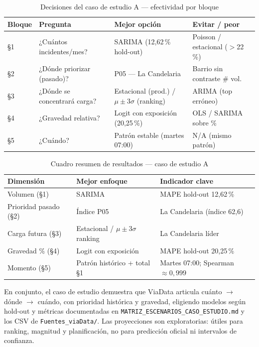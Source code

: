 \begin{table}[H]
	\centering
	\caption{Decisiones del caso de estudio A — efectividad por bloque}
	\label{tab:caso-estudio-decisiones}
	\small
	\begin{tabularx}{\linewidth}{@{}l X l l@{}}
		\toprule
		\textbf{Bloque} & \textbf{Pregunta} & \textbf{Mejor opción} & \textbf{Evitar / peor} \\
		\midrule
		§1 & ¿Cuántos incidentes/mes? & SARIMA (12,62\,\% hold-out) & Poisson / estacional ($>$22\,\%) \\
		§2 & ¿Dónde priorizar (pasado)? & P05 — La Candelaria & Barrio sin contraste \# vol. \\
		§3 & ¿Dónde se concentrará carga? & Estacional (prod.) / $\mu \pm 3\sigma$ (ranking) & ARIMA (top erróneo) \\
		§4 & ¿Gravedad relativa? & Logit con exposición (20,25\,\%) & OLS / SARIMA sobre \% \\
		§5 & ¿Cuándo? & Patrón estable (martes 07:00) & N/A (mismo patrón) \\
		\bottomrule
	\end{tabularx}
\end{table}

\begin{table}[H]
	\centering
	\caption{Cuadro resumen de resultados — caso de estudio A}
	\label{tab:caso-estudio-resumen}
	\small
	\begin{tabularx}{\linewidth}{@{}l l X@{}}
		\toprule
		\textbf{Dimensión} & \textbf{Mejor enfoque} & \textbf{Indicador clave} \\
		\midrule
		Volumen (§1) & SARIMA & MAPE hold-out 12,62\,\% \\
		Prioridad pasado (§2) & Índice P05 & La Candelaria (índice 62,6) \\
		Carga futura (§3) & Estacional / $\mu \pm 3\sigma$ ranking & La Candelaria líder \\
		Gravedad \% (§4) & Logit con exposición & MAPE hold-out 20,25\,\% \\
		Momento (§5) & Patrón histórico + total §1 & Martes 07:00; Spearman $\approx 0{,}999$ \\
		\bottomrule
	\end{tabularx}
\end{table}

En conjunto, el caso de estudio demuestra que ViaData articula cuánto $\rightarrow$ dónde $\rightarrow$ cuándo, con prioridad histórica y gravedad, eligiendo modelos según hold-out y métricas documentadas en \texttt{MATRIZ\_ESCENARIOS\_CASO\_ESTUDIO.md} y los CSV de \texttt{Fuentes\_viaData/}. Las proyecciones son exploratorias: útiles para ranking, magnitud y planificación, no para predicción oficial ni intervalos de confianza.

